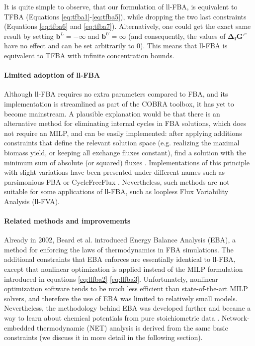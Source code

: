 \documentclass[twocolumn]{bmcart}%
\begin{document}
It is quite simple to observe, that our formulation of ll-FBA, is equivalent to TFBA (Equations \ref{eq:tfba1}-\ref{eq:tfba5}), while dropping the two last constraints (Equations \ref{eq:tfba6} and \ref{eq:tfba7}). Alternatively, one could get the exact same result by setting $\mathbf{b}^L = -\infty$ and $\mathbf{b}^U = \infty$ (and consequently, the values of $\mathbf{\Delta_f G'^\circ}$ have no effect and can be set arbitrarily to 0). This means that ll-FBA is equivalent to TFBA with infinite concentration bounds.


\paragraph{Limited adoption of ll-FBA} Although ll-FBA requires no extra parameters compared to FBA, and its implementation is streamlined as part of the COBRA toolbox, it has yet to become mainstream. A plausible explanation would be that there is an alternative method for eliminating internal cycles in FBA solutions, which does not require an MILP, and can be easily implemented: after applying additions constraints that  define the relevant solution space (e.g. realizing the maximal biomass yield, or keeping all exchange fluxes constant), find a solution with the minimum sum of absolute (or squared) fluxes \cite{Holzhutter2004-qj}. Implementations of this principle with slight variations have been presented under different names such as parsimonious FBA \cite{Lewis2010-rx, Schuetz2012-sv} or CycleFreeFlux \cite{Desouki2015-lh}. Nevertheless, such methods are not suitable for some applications of ll-FBA, such as loopless Flux Variability Analysis (ll-FVA).

\paragraph{Related methods and improvements}
Already in 2002, Beard et al. \cite{Beard2002-xt} introduced Energy Balance Analysis (EBA), a method for enforcing the laws of thermodynamics in FBA simulations. The additional constraints that EBA enforces are essentially identical to ll-FBA, except that nonlinear optimization is applied instead of the MILP formulation introduced in equations \ref{eq:llfba2}-\ref{eq:llfba3}. Unfortunately, nonlinear optimization software tends to be much less efficient than state-of-the-art MILP solvers, and therefore the use of EBA was limited to relatively small models. Nevertheless, the methodology behind EBA was developed further and became a way to learn about chemical potentials from pure stoichiometric data \cite{Beard2004, Warren2007-wm, Reznik2013}. Network-embedded thermodynamic (NET) analysis \cite{Kummel2006-px, Kummel2006-qn, Zamboni2008} is derived from the same basic constraints (we discuss it in more detail in the following section).
\end{document}
